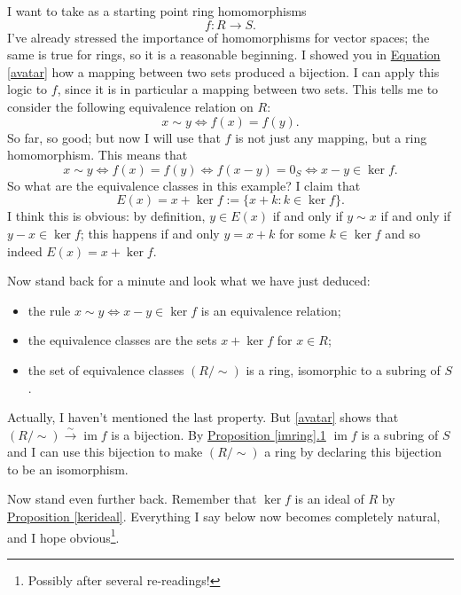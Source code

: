 \documentclass[11pt]{amsbook}
\DeclareMathOperator{\im}{\mathrm{im}}
\theoremstyle{definition}
\begin{document}
I want to take as a starting point ring homomorphisms $$f: R\to S.$$ I've already stressed the importance of homomorphisms for vector spaces; the same is true for rings, so it is a reasonable beginning. I showed you in \hyperref[avatar]{Equation \eqref{avatar}} how a mapping between two sets produced a bijection. I can apply this logic to $f$, since it is in particular a mapping between two sets. This tells me to consider the following equivalence relation on $R$:
$$ x\sim y \Leftrightarrow f(x)=f(y).$$ So far, so good; but now I will use that $f$ is not just any mapping, but a ring homomorphism. This means that $$x\sim y \Leftrightarrow f(x) = f(y) \Leftrightarrow f(x-y) = 0_S \Leftrightarrow x-y \in \ker f.$$ So what are the equivalence classes in this example? I claim that $$E(x) = x + \ker f := \{ x +k : k\in \ker f \}.$$ I think this is obvious: by definition, $y\in E(x)$ if and only if $y\sim x$ if and only if $y-x\in \ker f$; this happens if and only $y = x + k$ for some $k\in \ker f$ and so indeed $E(x) = x + \ker f$.
\bigskip

Now stand back for a minute and look what we have just deduced:
\begin{itemize}
\item the rule $x \sim y \Leftrightarrow x-y \in \ker f$ is an equivalence relation;
\item the equivalence classes are the sets $x + \ker f$ for $x\in R$;
\item the set of equivalence classes $(R/\sim)$ is a ring, isomorphic to a subring of $S$.
\end{itemize}
Actually, I haven't mentioned the last property. But \eqref{avatar} shows that $(R/\sim) \stackrel{\sim}{\to} \im f$ is a bijection. By \hyperref[imring]{Proposition \ref{imring}.1} $\im f$ is a subring of $S$ and I can use this bijection to make $(R/\sim)$ a ring by declaring this bijection to be an isomorphism.
\bigskip

Now stand even further back. Remember that $\ker f$ is an ideal of $R$ by \hyperref[kerideal]{Proposition \ref{kerideal}}. Everything I say below now becomes completely natural, and I hope obvious\footnote{Possibly after several re-readings!}.
\bigskip
\end{document}
